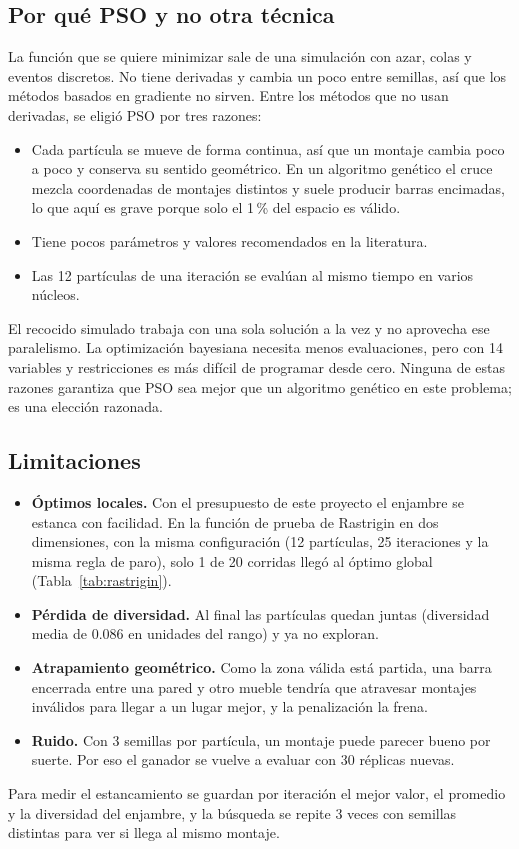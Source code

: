\documentclass[11pt,letterpaper]{article}
\begin{document}
\subsection{Por qué PSO y no otra técnica}
La función que se quiere minimizar sale de una simulación con azar, colas y eventos discretos. No tiene derivadas y cambia un poco entre semillas, así que los métodos basados en gradiente no sirven. Entre los métodos que no usan derivadas, se eligió PSO por tres razones:
\begin{itemize}
\item Cada partícula se mueve de forma continua, así que un montaje cambia poco a poco y conserva su sentido geométrico. En un algoritmo genético el cruce mezcla coordenadas de montajes distintos y suele producir barras encimadas, lo que aquí es grave porque solo el 1\,\% del espacio es válido.
\item Tiene pocos parámetros y valores recomendados en la literatura.
\item Las 12 partículas de una iteración se evalúan al mismo tiempo en varios núcleos.
\end{itemize}
El recocido simulado trabaja con una sola solución a la vez y no aprovecha ese paralelismo. La optimización bayesiana necesita menos evaluaciones, pero con 14 variables y restricciones es más difícil de programar desde cero. Ninguna de estas razones garantiza que PSO sea mejor que un algoritmo genético en este problema; es una elección razonada.

\subsection{Limitaciones}
\begin{itemize}
\item \textbf{Óptimos locales.} Con el presupuesto de este proyecto el enjambre se estanca con facilidad. En la función de prueba de Rastrigin en dos dimensiones, con la misma configuración (12 partículas, 25 iteraciones y la misma regla de paro), solo 1 de 20 corridas llegó al óptimo global (Tabla~\ref{tab:rastrigin}).
\item \textbf{Pérdida de diversidad.} Al final las partículas quedan juntas (diversidad media de 0.086 en unidades del rango) y ya no exploran.
\item \textbf{Atrapamiento geométrico.} Como la zona válida está partida, una barra encerrada entre una pared y otro mueble tendría que atravesar montajes inválidos para llegar a un lugar mejor, y la penalización la frena.
\item \textbf{Ruido.} Con 3 semillas por partícula, un montaje puede parecer bueno por suerte. Por eso el ganador se vuelve a evaluar con 30 réplicas nuevas.
\end{itemize}
Para medir el estancamiento se guardan por iteración el mejor valor, el promedio y la diversidad del enjambre, y la búsqueda se repite 3 veces con semillas distintas para ver si llega al mismo montaje.
\end{document}
